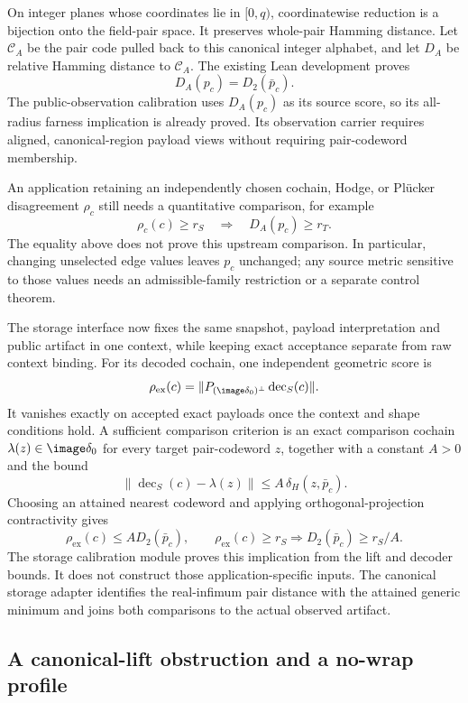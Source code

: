 On integer planes whose coordinates lie in \([0,q)\), coordinatewise
reduction is a bijection onto the field-pair space. It preserves whole-pair
Hamming distance. Let \(\mathcal C_A\) be the pair code pulled back to
this canonical integer alphabet, and let \(D_A\) be relative Hamming
distance to \(\mathcal C_A\). The existing Lean development proves
\[
  D_A(p_c)=D_2(\bar p_c).
\]
The public-observation calibration uses \(D_A(p_c)\) as its source score,
so its all-radius farness implication is already proved. Its observation
carrier requires aligned, canonical-region payload views without requiring
pair-codeword membership.

An application retaining an independently chosen cochain, Hodge, or
Pl\"ucker disagreement \(\rho_c\) still needs a quantitative comparison,
for example
\[
  \rho_c(c)\ge r_S
  \quad\Longrightarrow\quad
  D_A(p_c)\ge r_T.
\]
The equality above does not prove this upstream comparison. In particular,
changing unselected edge values leaves \(p_c\) unchanged; any source metric
sensitive to those values needs an admissible-family restriction or a
separate control theorem.

The storage interface now fixes the same snapshot, payload interpretation
and public artifact in one context, while keeping exact acceptance separate
from raw context binding. For its decoded cochain, one independent geometric
score is
\[
  \rho_{\mathrm{ex}}(c)
   =\|P_{(\image\delta_0)^\perp}\operatorname{dec}_S(c)\|.
\]
It vanishes exactly on accepted exact payloads once the context and shape
conditions hold. A sufficient comparison criterion is an exact comparison cochain
\(\lambda(z)\in\image\delta_0\) for every target pair-codeword \(z\),
together with a constant \(A>0\) and the bound
\[
  \|\operatorname{dec}_S(c)-\lambda(z)\|
    \le A\,\delta_H(z,\bar p_c).
\]
Choosing an attained nearest codeword and applying orthogonal-projection
contractivity gives
\[
  \rho_{\mathrm{ex}}(c)\le A D_2(\bar p_c),
  \qquad
  \rho_{\mathrm{ex}}(c)\ge r_S
    \Longrightarrow D_2(\bar p_c)\ge r_S/A.
\]
The storage calibration module proves this implication from the lift and
decoder bounds. It does not construct those application-specific inputs.
The canonical storage adapter identifies the real-infimum pair distance
with the attained generic minimum and joins both comparisons to the actual
observed artifact.

\subsection{A canonical-lift obstruction and a no-wrap profile}

